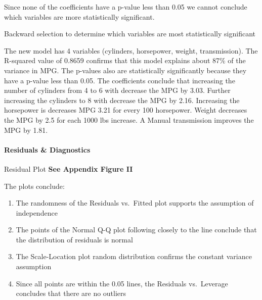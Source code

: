 \documentclass[
]{article}
\newenvironment{Shaded}{\begin{snugshade}}{\end{snugshade}}
\newcommand{\CommentTok}[1]{\textcolor[rgb]{0.56,0.35,0.01}{\textit{#1}}}
\newcommand{\KeywordTok}[1]{\textcolor[rgb]{0.13,0.29,0.53}{\textbf{#1}}}
\newcommand{\NormalTok}[1]{#1}
\newcommand{\OperatorTok}[1]{\textcolor[rgb]{0.81,0.36,0.00}{\textbf{#1}}}
\newcommand{\StringTok}[1]{\textcolor[rgb]{0.31,0.60,0.02}{#1}}
\providecommand{\tightlist}{%
  \setlength{\itemsep}{0pt}\setlength{\parskip}{0pt}}
\begin{document}
Since none of the coefficients have a p-value less than 0.05 we cannot
conclude which variables are more statistically significant.

Backward selection to determine which variables are most statistically
significant

\begin{Shaded}
\end{Shaded}

The new model has 4 variables (cylinders, horsepower, weight,
transmission). The R-squared value of 0.8659 confirms that this model
explains about 87\% of the variance in MPG. The p-values also are
statistically significantly because they have a p-value less than 0.05.
The coefficients conclude that increasing the number of cylinders from 4
to 6 with decrease the MPG by 3.03. Further increasing the cylinders to
8 with decrease the MPG by 2.16. Increasing the horsepower is decreases
MPG 3.21 for every 100 horsepower. Weight decreases the MPG by 2.5 for
each 1000 lbs increase. A Manual transmission improves the MPG by 1.81.

\hypertarget{residuals-diagnostics}{%
\paragraph{Residuals \& Diagnostics}\label{residuals-diagnostics}}

Residual Plot \textbf{See Appendix Figure II}

The plots conclude:

\begin{enumerate}
\def\labelenumi{\arabic{enumi}.}
\tightlist
\item
  The randomness of the Residuals vs.~Fitted plot supports the
  assumption of independence
\item
  The points of the Normal Q-Q plot following closely to the line
  conclude that the distribution of residuals is normal
\item
  The Scale-Location plot random distribution confirms the constant
  variance assumption
\item
  Since all points are within the 0.05 lines, the Residuals vs.~Leverage
  concludes that there are no outliers
\end{enumerate}
\end{document}
